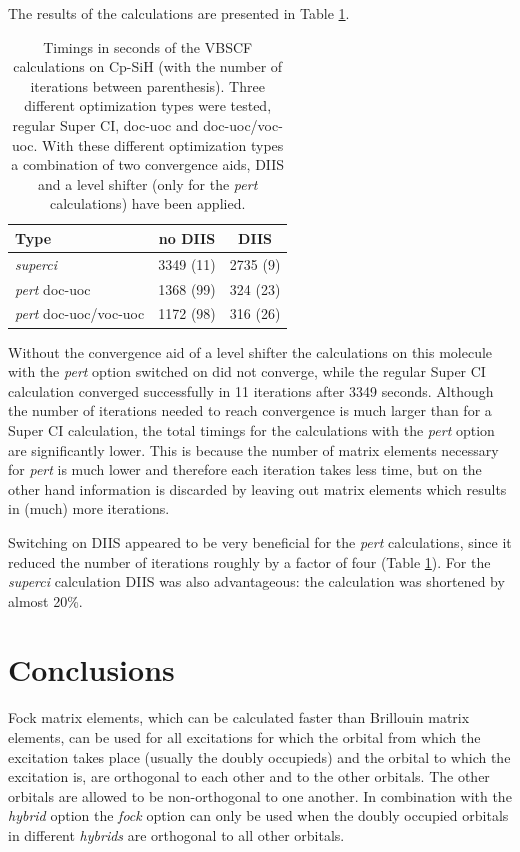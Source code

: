 The results of the calculations are presented in Table \ref{ch2.tab.budzelaar}.
\begin{table}[htdp]
\caption{Timings in seconds of the VBSCF calculations on Cp-SiH (with the number of iterations between parenthesis). Three different optimization types were tested, regular Super CI, doc-uoc and doc-uoc/voc-uoc. With these different optimization types a combination of two convergence aids, DIIS and a level shifter (only for the \textit{pert} calculations) have been applied.}
\begin{center}
\begin{tabular}{l c c}
\hline
Type & no DIIS & DIIS \\
\hline
\textit{superci} & 3349 (11) & 2735 (9) \\ 
\textit{pert} doc-uoc & 1368 (99) & 324 (23)\\ 
\textit{pert} doc-uoc/voc-uoc & 1172 (98) & 316 (26)\\
\end{tabular}
\label{ch2.tab.budzelaar}
\end{center}
\end{table}
Without the convergence aid of a level shifter the calculations on this molecule with the \textit{pert} option switched on did not converge, while the regular Super CI calculation converged successfully in 11 iterations after 3349 seconds. Although the number of iterations needed to reach convergence is much larger than for a Super CI calculation, the total timings for the calculations with the \textit{pert} option are significantly lower. This is because the number of matrix elements necessary for \textit{pert} is much lower and therefore each iteration takes less time, but on the other hand information is discarded by leaving out matrix elements which results in (much) more iterations. 

Switching on DIIS appeared to be very beneficial for the \textit{pert} calculations, since it reduced the number of iterations roughly by a factor of four (Table \ref{ch2.tab.budzelaar}). For the \textit{superci} calculation DIIS was also advantageous: the calculation was shortened by almost 20\%.

\section{Conclusions}

Fock matrix elements, which can be calculated faster than Brillouin matrix elements, can be used for all excitations for which the orbital from which the excitation takes place (usually the doubly occupieds) and the orbital to which the excitation is, are orthogonal to each other and to the other orbitals. The other orbitals are allowed to be non-orthogonal to one another. In combination with the \textit{hybrid} option the \textit{fock} option can only be used when the doubly occupied orbitals in different \textit{hybrids} are orthogonal to all other orbitals.

